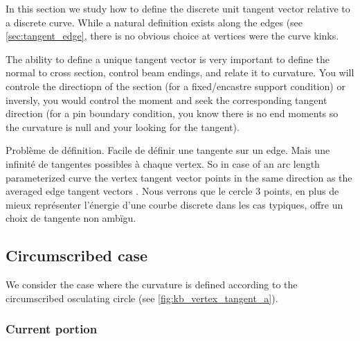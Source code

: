 In this section we study how to define the discrete unit tangent vector relative to a discrete curve. While a natural definition exists along the edges (see \cref{sec:tangent_edge}, there is no obvious choice at vertices were the curve kinks.

The ability to define a unique tangent vector is very important to define the normal to cross section, control beam endings, and relate it to curvature.
You will controle the directiopn of the section (for a fixed/encastre support condition) or inversly, you would control the moment and seek the corresponding tangent direction (for a pin boundary condition, you know there is no end moments so the curvature is null and your looking for the tangent).

Problème de définition. Facile de définir une tangente sur un edge. Mais une infinité de tangentes possibles à chaque vertex. So in case of an arc length parameterized curve the vertex tangent vector points in the same direction as the averaged edge tangent vectors \cite[p.12]{Hoffmann2008}. Nous verrons que le cercle 3 points, en plus de mieux représenter l'énergie d'une courbe discrete dans les cas typiques, offre un choix de tangente non ambïgu.

\subsection{Circumscribed case}

We consider the case where the curvature is defined according to the circumscribed osculating circle (see \cref{fig:kb_vertex_tangent_a}). 

\subsubsection{Current portion}

